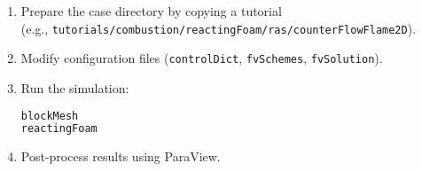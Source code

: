 \begin{enumerate}
    \item Prepare the case directory by copying a tutorial \\ (e.g., \texttt{tutorials/combustion/reactingFoam/ras/counterFlowFlame2D}).
    \item Modify configuration files (\texttt{controlDict}, \texttt{fvSchemes}, \texttt{fvSolution}).
    \item Run the simulation:
\begin{lstlisting}[language=bash, caption={Running the Simulation.}]
blockMesh
reactingFoam
\end{lstlisting}
    \item Post-process results using ParaView.
\end{enumerate}
